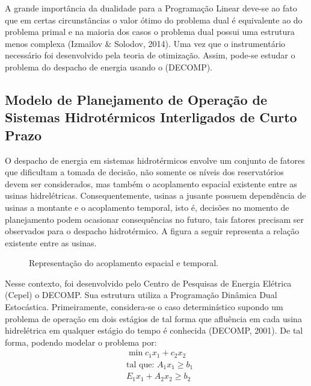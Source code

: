 \documentclass[12pt,fleqn]{article}
\begin{document}
A grande import\^ancia da dualidade para a Programa\c c\~ao Linear deve-se ao fato que em certas circunst\^ancias o valor \'otimo do problema dual \'e equivalente ao do
problema primal e na maioria dos casos o problema dual possui uma estrutura menos complexa (Izmailov \& Solodov, 2014). Uma
vez que o instrument\'ario necess\'ario foi desenvolvido pela teoria de otimiza\c c\~ao. Assim, pode-se estudar o problema do despacho de
energia usando o (DECOMP). 

\subsection{Modelo de Planejamento de Opera\c c\~ao de Sistemas Hidrot\'ermicos Interligados de Curto Prazo}
O despacho de energia em sistemas hidrot\'ermicos envolve um conjunto de fatores que dificultam a tomada de decis\~ao, 
n\~ao somente os n\'iveis dos reservat\'orios devem ser considerados, mas tamb\'em o acoplamento espacial existente entre as usinas
hidrel\'etricas. Consequentemente, usinas a jusante possuem depend\^encia de usinas a montante e o acoplamento temporal, isto
\'e,
decis\~oes no momento de planejamento podem ocasionar consequ\^encias no futuro, tais fatores  precisam ser observados para
o despacho hidrot\'ermico. A figura a seguir representa a rela\c c\~ao existente entre as usinas. 

\begin{figure}[!htpb]
  \centering
  \resizebox{0.5\textwidth}{!}{%
  }
  \caption{Representa\c c\~ao do acoplamento espacial e temporal.}
\end{figure}

Nesse contexto, foi desenvolvido pelo Centro de Pesquisas de Energia El\'etrica (Cepel) o DECOMP. Sua estrutura
utiliza a Programa\c c\~ao Din\^amica Dual Estoc\'astica. Primeiramente, considera-se o caso determin\'istico supondo um problema de opera\c
c\~ao em dois est\'agios de tal forma que 
aflu\^encia em cada usina hidrel\'etrica em qualquer est\'agio do tempo \'e conhecida (DECOMP, 2001). De tal forma, podendo modelar o problema por:
\begin{align}
&\min c_1x_1 + c_2x_2 \nonumber \\
&\mbox{tal que: }	A_1 x_1 \geq b_1 \nonumber\\
&E_1 x_1 + A_2 x_2 \geq b_2
	\label{p1}
\end{align}
\end{document}
